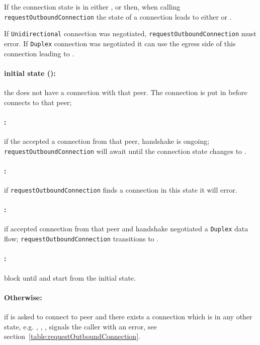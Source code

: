 If the connection state is in either \ReservedOutboundState{},
\UnnegotiatedStateIn{} or \InboundStateDup{} then, when calling
\texttt{requestOutboundConnection} the state of a connection leads to either
\OutboundStateUni{} or \DuplexState{}.

If \texttt{Unidirectional} connection was
negotiated, \texttt{requestOutboundConnection} must error. If \texttt{Duplex}
connection was negotiated it can use the egress side of this connection leading
to \DuplexState{}.

\paragraph{\textnormal{initial state (\InitialState{})}:} the \connmngr{} does not have
  a connection with that peer. The connection is put in \ReservedOutboundState{}
  before \connmngr{} connects to that peer;

\paragraph{\UnnegotiatedStateIn{}:} if the \connmngr{} accepted
  a connection from that peer, handshake is ongoing;
  \texttt{requestOutboundConnection} will await until the connection state
  changes to \InboundStateAny{}.

\paragraph{\InboundStateUni{}:} if \texttt{requestOutboundConnection} finds
a connection in this state it will error.

\paragraph{\InboundStateDup{}:} if \connmngr{} accepted connection from
  that peer and handshake negotiated a \texttt{Duplex} data flow;
  \texttt{requestOutboundConnection} transitions to \DuplexState{}.

\paragraph{\TerminatingState{}:} block until \TerminatedState{} and start from
the initial state.

\paragraph{\textnormal{Otherwise}:} if \connmngr{} is asked to connect to
peer and there exists a connection which is in any other state, e.g.
\UnnegotiatedStateOut{}, \OutboundStateAny{}, \DuplexState{}, \connmngr{} signals the caller with an error, see
section~\ref{table:requestOutboundConnection}.

